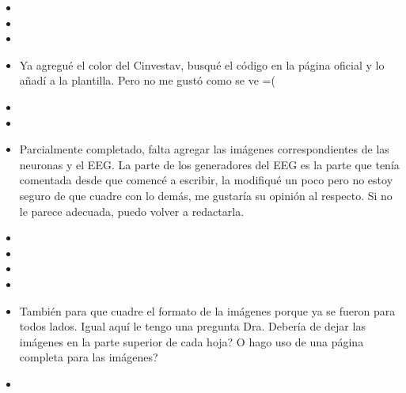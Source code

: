 %



\begin{itemize}
	\item {}
	\item {}
	\item {}
	\item {} Ya agregué el color del Cinvestav, busqué el código en la página oficial y lo añadí a la plantilla. Pero no me gustó como se ve =(
	\item {}
	\item {}
	\item {} Parcialmente completado, falta agregar las imágenes correspondientes de las neuronas y el EEG. La parte de los generadores del EEG es la parte que tenía comentada desde que comencé a escribir, la modifiqué un poco pero no estoy seguro de que cuadre con lo demás, me gustaría su opinión al respecto. Si no le parece adecuada, puedo volver a redactarla.
	\item {}
	\item {}
	\item {}
	\item {}
	\item {} También para que cuadre el formato de la imágenes porque ya se fueron para todos lados. Igual aquí le tengo una pregunta Dra. Debería de dejar las imágenes en la parte superior de cada hoja? O hago uso de una página completa para las imágenes?
	\item {}
\end{itemize}
